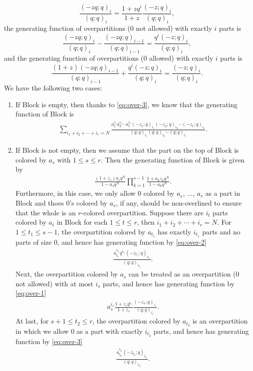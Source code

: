 \documentclass[12pt,reqno]{amsart}
\numberwithin{equation}{section}
\theoremstyle{plain}
\theoremstyle{definition}
\newcommand{\bl}[1]{\uppercase\expandafter{\romannumeral#1}}
\begin{document}
\begin{equation}\label{eq:over-1}
\frac{(-zq;q)_i}{(q;q)_i}=\frac{1+z q^i}{1+z}\frac{(-z;q)_i}{(q;q)_i},
\end{equation}
the generating function of overpartitions ($0$ not allowed) with exactly $i$ parts is
\begin{equation}\label{eq:over-2}
\frac{(-zq;q)_i}{(q;q)_i}-\frac{(-zq;q)_{i-1}}{(q;q)_{i-1}}=\frac{q^i (-z;q)_i}{(q;q)_i},
\end{equation}
and the generating function of overpartitions ($0$ allowed) with exactly $i$ parts is
\begin{equation}\label{eq:over-3}
\frac{(1+z)(-zq;q)_{i-1}}{(q;q)_{i-1}}+\frac{q^i (-z;q)_i}{(q;q)_i}=\frac{(-z;q)_i}{(q;q)_i}.
\end{equation}
We have the following two cases:
\begin{enumerate}[\indent 1).]
\item If Block \bl{3} is empty, then thanks to \eqref{eq:over-3}, we know that the generating function of Block \bl{2} is
\begin{align*}
\sum_{i_{1}+i_{2}+\cdots+i_{r}=N}\frac{a_{1}^{i_{1}}a_{2}^{i_{2}}\cdots a_{r}^{i_{r}}(-z_1;q)_{i_{1}}(-z_2;q)_{i_{2}}\cdots(-z_r;q)_{i_{r}}}{(q;q)_{i_{1}}(q;q)_{i_{2}}\cdots(q;q)_{i_{r}}}.
\end{align*}
\item If Block \bl{3} is not empty, then we assume that the part on the top of Block \bl{3} is colored by $a_s$ with $1\le s\le r$. Then the generating function of Block \bl{3} is given by
\begin{align*}
\frac{(1+z_s) a_s q^N}{1-a_s q^N} \prod_{k=1}^{s-1} \frac{1+a_k z_k q^N}{1-a_k q^N}.
\end{align*}
Furthermore, in this case, we only allow $0$ colored by $a_{s}$, $\ldots$, $a_r$ as a part in Block \bl{2} and thoes $0$'s colored by $a_s$, if any, should be non-overlined to ensure that the whole is an $r$-colored overpartition. Suppose there are $i_t$ parts colored by $a_t$ in Block \bl{2} for each $1\le t\le r$, then $i_{1}+i_{2}+\cdots+i_{r}=N$. For $1\le t_1\le s-1$, the overpartition colored by $a_{t_1}$ has exactly $i_{t_1}$ parts and no parts of size $0$, and hence has generating function by \eqref{eq:over-2}
\begin{align*}
\frac{a_{t_1}^{i_{t_1}}q^{i_{t_1}}(-z_{t_1};q)_{i_{t_1}}}{(q;q)_{i_{t_1}}}.
\end{align*}
Next, the overpartition colored by $a_s$ can be treated as an overpartition ($0$ not allowed) with at most $i_s$ parts, and hence has generating function by \eqref{eq:over-1}
\begin{align*}
a_s^{i_s}\frac{1+z_s q^{i_s}}{1+z_s}\frac{(-z_s;q)_{i_s}}{(q;q)_{i_s}}.
\end{align*}
At last, for $s+1\le t_2\le r$, the overpartition colored by $a_{t_2}$ is an overpartition in which we allow $0$ as a part with exactly $i_{t_2}$ parts, and hence has generating function by \eqref{eq:over-3}
\begin{align*}
\frac{a_{t_2}^{i_{t_2}}(-z_{t_2};q)_{i_{t_2}}}{(q;q)_{i_{t_2}}}.
\end{align*}
\end{enumerate}
\end{document}
